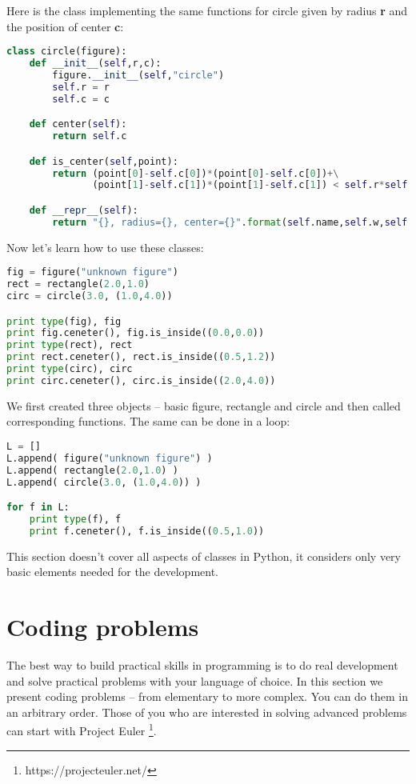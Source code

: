 Here is the class implementing the same functions for circle given
by radius \textbf{r} and the position of center \textbf{c}:

\begin{lstlisting}[language=Python,style=codelst2,caption={Python: derived class (circle)}]
class circle(figure):
    def __init__(self,r,c):
        figure.__init__(self,"circle")
        self.r = r
        self.c = c

    def center(self):
        return self.c

    def is_center(self,point):
        return (point[0]-self.c[0])*(point[0]-self.c[0])+\
               (point[1]-self.c[1])*(point[1]-self.c[1]) < self.r*self.r

    def __repr__(self):
        return "{}, radius={}, center={}".format(self.name,self.w,self.h)
\end{lstlisting}
Now let's learn how to use these classes:

\begin{lstlisting}[language=Python,style=codelst2,caption={Python: using classes}]
fig = figure("unknown figure")
rect = rectangle(2.0,1.0)
circ = circle(3.0, (1.0,4.0))

print type(fig), fig
print fig.ceneter(), fig.is_inside((0.0,0.0))
print type(rect), rect
print rect.ceneter(), rect.is_inside((0.5,1.2))
print type(circ), circ
print circ.ceneter(), circ.is_inside((2.0,4.0))
\end{lstlisting}
We first created three objects -- basic figure, rectangle and circle and then
called corresponding functions. The same can be done in a loop:

\begin{lstlisting}[language=Python,style=codelst2,caption={Python: using classes - 2}]
L = []
L.append( figure("unknown figure") )
L.append( rectangle(2.0,1.0) )
L.append( circle(3.0, (1.0,4.0)) )

for f in L:
    print type(f), f
    print f.ceneter(), f.is_inside((0.5,1.0))
\end{lstlisting}

This section doesn't cover all aspects of classes in Python, it
considers only very basic elements needed for the development.



\section{Coding problems}

The best way to build practical skills in programming is to do
real development and solve practical problems with your language
of choice. In this section we present coding problems -- from elementary
to more complex. You can do them in an arbitrary order. Those of
you who are interested in solving advanced problems can start 
with Project Euler \footnote{https://projecteuler.net/}.


